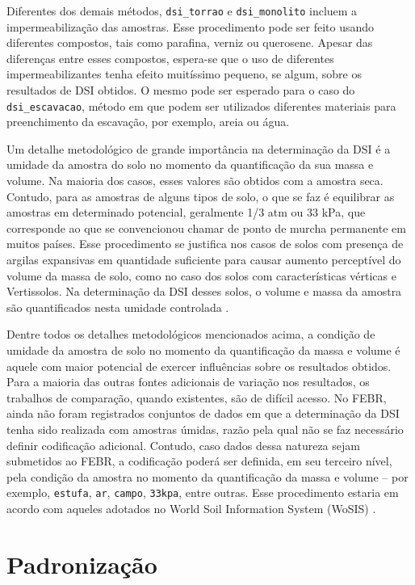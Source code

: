 \documentclass[
]{book}
\begin{document}
Diferentes dos demais métodos, \texttt{dsi\_torrao} e \texttt{dsi\_monolito} incluem a impermeabilização das amostras. Esse procedimento pode ser feito usando diferentes compostos, tais como parafina, verniz ou querosene. Apesar das diferenças entre esses compostos, espera-se que o uso de diferentes impermeabilizantes tenha efeito muitíssimo pequeno, se algum, sobre os resultados de DSI obtidos. O mesmo pode ser esperado para o caso do \texttt{dsi\_escavacao}, método em que podem ser utilizados diferentes materiais para preenchimento da escavação, por exemplo, areia ou água.

Um detalhe metodológico de grande importância na determinação da DSI é a umidade da amostra do solo no momento da quantificação da sua massa e volume. Na maioria dos casos, esses valores são obtidos com a amostra seca. Contudo, para as amostras de alguns tipos de solo, o que se faz é equilibrar as amostras em determinado potencial, geralmente 1/3 atm ou 33 kPa, que corresponde ao que se convencionou chamar de ponto de murcha permanente em muitos países. Esse procedimento se justifica nos casos de solos com presença de argilas expansivas em quantidade suficiente para causar aumento perceptível do volume da massa de solo, como no caso dos solos com características vérticas e Vertissolos. Na determinação da DSI desses solos, o volume e massa da amostra são quantificados nesta umidade controlada \citep{MathieuEtAl1998}.

Dentre todos os detalhes metodológicos mencionados acima, a condição de umidade da amostra de solo no momento da quantificação da massa e volume é aquele com maior potencial de exercer influências sobre os resultados obtidos. Para a maioria das outras fontes adicionais de variação nos resultados, os trabalhos de comparação, quando existentes, são de difícil acesso. No FEBR, ainda não foram registrados conjuntos de dados em que a determinação da DSI tenha sido realizada com amostras úmidas, razão pela qual não se faz necessário definir codificação adicional. Contudo, caso dados dessa natureza sejam submetidos ao FEBR, a codificação poderá ser definida, em seu terceiro nível, pela condição da amostra no momento da quantificação da massa e volume -- por exemplo, \texttt{estufa}, \texttt{ar}, \texttt{campo}, \texttt{33kpa}, entre outras. Esse procedimento estaria em acordo com aqueles adotados no World Soil Information System (WoSIS) \citep{RibeiroEtAl2018}.

\hypertarget{padronizauxe7uxe3o-1}{%
\section{Padronização}\label{padronizauxe7uxe3o-1}}
\end{document}
